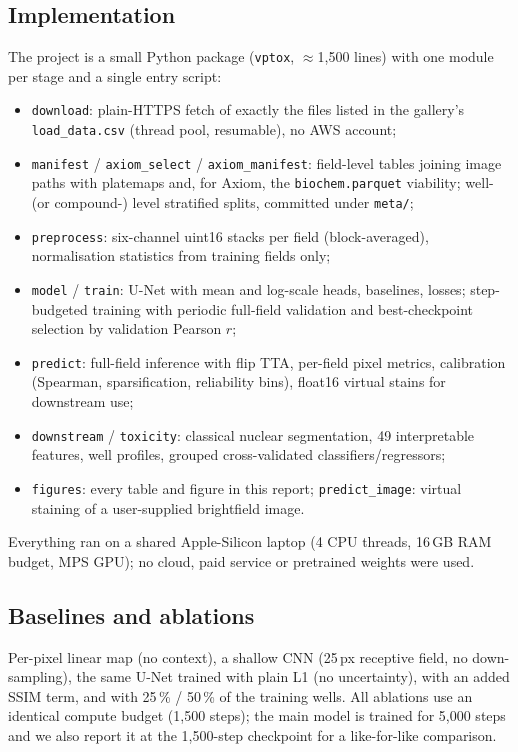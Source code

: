 \documentclass[11pt,a4paper]{article}
\begin{document}
\subsection{Implementation}
The project is a small Python package (\texttt{vptox}, $\approx$1,500 lines) with one module per stage and a single entry script:
\begin{itemize}\itemsep0pt
\item \texttt{download}: plain-HTTPS fetch of exactly the files listed in the gallery's \texttt{load\_data.csv} (thread pool, resumable), no AWS account;
\item \texttt{manifest} / \texttt{axiom\_select} / \texttt{axiom\_manifest}: field-level tables joining image paths with platemaps and, for Axiom, the \texttt{biochem.parquet} viability; well- (or compound-) level stratified splits, committed under \texttt{meta/};
\item \texttt{preprocess}: six-channel uint16 stacks per field (block-averaged), normalisation statistics from training fields only;
\item \texttt{model} / \texttt{train}: U-Net with mean and log-scale heads, baselines, losses; step-budgeted training with periodic full-field validation and best-checkpoint selection by validation Pearson $r$;
\item \texttt{predict}: full-field inference with flip TTA, per-field pixel metrics, calibration (Spearman, sparsification, reliability bins), float16 virtual stains for downstream use;
\item \texttt{downstream} / \texttt{toxicity}: classical nuclear segmentation, 49 interpretable features, well profiles, grouped cross-validated classifiers/regressors;
\item \texttt{figures}: every table and figure in this report; \texttt{predict\_image}: virtual staining of a user-supplied brightfield image.
\end{itemize}
Everything ran on a shared Apple-Silicon laptop (4 CPU threads, 16\,GB RAM budget, MPS GPU); no cloud, paid service or pretrained weights were used.

\subsection{Baselines and ablations}
Per-pixel linear map (no context), a shallow CNN (25\,px receptive field, no down-sampling), the same U-Net trained with plain L1 (no uncertainty), with an added SSIM term, and with 25\,\% / 50\,\% of the training wells. All ablations use an identical compute budget (1,500 steps); the main model is trained for 5,000 steps and we also report it at the 1,500-step checkpoint for a like-for-like comparison.
\end{document}
